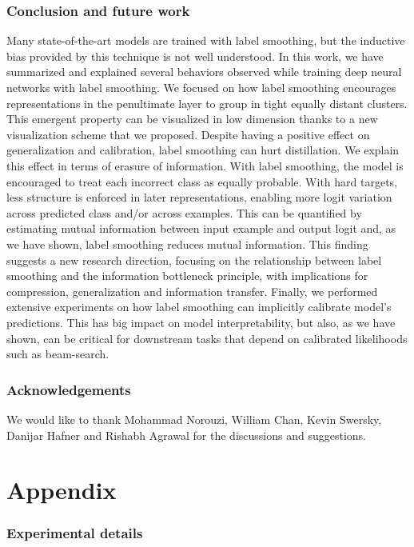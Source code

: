 \documentclass{article}
\begin{document}
\section{Conclusion and future work}

Many state-of-the-art models are trained with label smoothing, but the inductive bias provided by this technique is not well understood. In this work, we have summarized and explained several behaviors observed while training deep neural networks with label smoothing. We focused on how label smoothing encourages representations in the penultimate layer to group in tight equally distant clusters. This emergent property can be visualized in low dimension thanks to a new visualization scheme that we proposed. Despite having a positive effect on generalization and calibration, label smoothing can hurt distillation. We explain this effect in terms of erasure of information. With label smoothing, the model is encouraged to treat each incorrect class as equally probable. With hard targets, less structure is enforced in later representations, enabling more logit variation across predicted class and/or across examples. This can be quantified by estimating mutual information between input example and output logit and, as we have shown, label smoothing reduces mutual information. This finding suggests a new research direction, focusing on the relationship between label smoothing and the information bottleneck principle, with implications for compression, generalization and information transfer.  Finally, we performed extensive experiments on how label smoothing can implicitly calibrate model's predictions. This has big impact on model interpretability, but also, as we have shown, can be critical for downstream tasks that depend on calibrated likelihoods such as beam-search.

\section{Acknowledgements}
We would like to thank Mohammad Norouzi, William Chan, Kevin Swersky, Danijar Hafner 
and Rishabh Agrawal for the discussions and suggestions.





\newpage
\appendix
\part*{Appendix}
\section{Experimental details}
\end{document}
